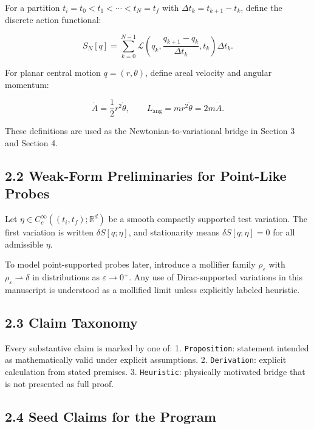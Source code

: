 \documentclass[
]{article}
\begin{document}
For a partition \(t_i=t_0< t_1<\cdots<t_N=t_f\) with
\(\Delta t_k=t_{k+1}-t_k\), define the discrete action functional:

\[
S_N[q] = \sum_{k=0}^{N-1} \mathcal{L}\!\left(q_k,\frac{q_{k+1}-q_k}{\Delta t_k},t_k\right)\Delta t_k.
\]

For planar central motion \(q=(r,\theta)\), define areal velocity and
angular momentum:

\[
\dot A = \frac{1}{2}r^2\dot\theta,\qquad
L_{\mathrm{ang}} = m r^2\dot\theta = 2m\dot A.
\]

These definitions are used as the Newtonian-to-variational bridge in
Section 3 and Section 4.

\hypertarget{weak-form-preliminaries-for-point-like-probes}{%
\subsection{2.2 Weak-Form Preliminaries for Point-Like
Probes}\label{weak-form-preliminaries-for-point-like-probes}}

Let \(\eta\in C_c^\infty((t_i,t_f);\mathbb{R}^d)\) be a smooth compactly
supported test variation. The first variation is written
\(\delta S[q;\eta]\), and stationarity means \(\delta S[q;\eta]=0\) for
all admissible \(\eta\).

To model point-supported probes later, introduce a mollifier family
\(\rho_\varepsilon\) with \(\rho_\varepsilon \rightharpoonup \delta\) in
distributions as \(\varepsilon\to 0^+\). Any use of Dirac-supported
variations in this manuscript is understood as a mollified limit unless
explicitly labeled heuristic.

\hypertarget{claim-taxonomy}{%
\subsection{2.3 Claim Taxonomy}\label{claim-taxonomy}}

Every substantive claim is marked by one of: 1. \texttt{Proposition}:
statement intended as mathematically valid under explicit assumptions.
2. \texttt{Derivation}: explicit calculation from stated premises. 3.
\texttt{Heuristic}: physically motivated bridge that is not presented as
full proof.

\hypertarget{seed-claims-for-the-program}{%
\subsection{2.4 Seed Claims for the
Program}\label{seed-claims-for-the-program}}
\end{document}
